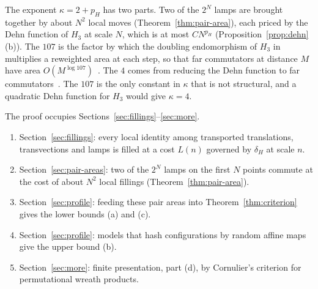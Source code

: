 The exponent $\kappa=2+p_H$ has two parts. Two of the $2^N$ lamps are brought together by about $N^2$ local moves
(Theorem~\ref{thm:pair-area}), each priced by the Dehn function of $H_3$ at scale $N$, which is at most $CN^{p_H}$
(Proposition~\ref{prop:dehn}(b)). The $107$ is the factor by which the doubling endomorphism of $H_3$ in~\cite[Section~3]{DouglasMghirbiA}
multiplies a reweighted area at each step, so that far commutators at distance $M$ have area $O(M^{\log107})$~\cite[Theorem~3.2]{DouglasMghirbiA}.
The $4$ comes from reducing the Dehn function to far commutators~\cite[Theorem~3.3]{DouglasMghirbiA}. The $107$ is the only constant in
$\kappa$ that is not structural, and a quadratic Dehn function for $H_3$ would give $\kappa=4$.

The proof occupies Sections~\ref{sec:fillings}--\ref{sec:more}.
\begin{enumerate}[label=(\roman*),itemsep=1pt]
\item Section~\ref{sec:fillings}: every local identity among transported translations, transvections and lamps is filled at a cost $L(n)$
governed by $\delta_H$ at scale $n$.
\item Section~\ref{sec:pair-areas}: two of the $2^N$ lamps on the first $N$ points commute at the cost of about $N^2$ local fillings
(Theorem~\ref{thm:pair-area}).
\item Section~\ref{sec:profile}: feeding these pair areas into Theorem~\ref{thm:criterion} gives the lower bounds (a) and (c).
\item Section~\ref{sec:profile}: models that hash configurations by random affine maps give the upper bound (b).
\item Section~\ref{sec:more}: finite presentation, part (d), by Cornulier's criterion for permutational wreath products.
\end{enumerate}
